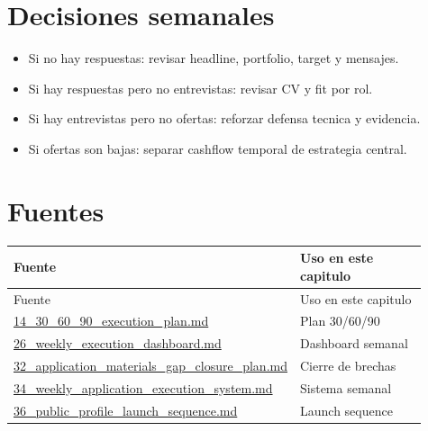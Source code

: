 \section{Decisiones semanales}


\begin{itemize}
\item Si no hay respuestas: revisar headline, portfolio, target y mensajes.
\item Si hay respuestas pero no entrevistas: revisar CV y fit por rol.
\item Si hay entrevistas pero no ofertas: reforzar defensa tecnica y evidencia.
\item Si ofertas son bajas: separar cashflow temporal de estrategia central.
\end{itemize}


\section{Fuentes}


\begin{center}
\scriptsize
\begin{longtable}{>{\raggedright\arraybackslash}p{0.455\linewidth} >{\raggedright\arraybackslash}p{0.455\linewidth}}
\toprule
Fuente & Uso en este capitulo \\
\midrule
\endfirsthead
\toprule
Fuente & Uso en este capitulo \\
\midrule
\endhead
\href{file:///E:/Laboral/14_30_60_90_execution_plan.md}{14\_30\_60\_90\_execution\_plan.md} & Plan 30/60/90 \\
\href{file:///E:/Laboral/26_weekly_execution_dashboard.md}{26\_weekly\_execution\_dashboard.md} & Dashboard semanal \\
\href{file:///E:/Laboral/32_application_materials_gap_closure_plan.md}{32\_application\_materials\_gap\_closure\_plan.md} & Cierre de brechas \\
\href{file:///E:/Laboral/34_weekly_application_execution_system.md}{34\_weekly\_application\_execution\_system.md} & Sistema semanal \\
\href{file:///E:/Laboral/36_public_profile_launch_sequence.md}{36\_public\_profile\_launch\_sequence.md} & Launch sequence \\
\bottomrule
\end{longtable}
\end{center}


